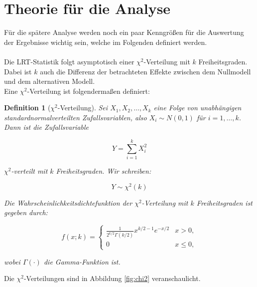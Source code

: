 \documentclass[%
thesis=student,%
coverpage=false,%
titlepage=false,%
headmarks=true, %
german,%
font=libertine, %
math=newpxtx, %
BCOR=5mm,%
coverBCOR=11mm%
]{tumbook}
\theoremstyle{break}
\newtheorem{definition}{Definition}[section]
\begin{document}
\section{Theorie für die Analyse}
Für die spätere Analyse werden noch ein paar Kenngrößen für die Auswertung der Ergebnisse wichtig sein, welche im Folgenden definiert werden.\\
\\
Die LRT-Statistik folgt asymptotisch einer $\chi^2$-Verteilung mit $k$ Freiheitsgraden. Dabei ist $k$ auch die Differenz der betrachteten Effekte zwischen dem Nullmodell und dem alternativen Modell. \\
Eine $\chi^2$-Verteilung ist folgendermaßen definiert:
\begin{definition}[$\chi^2$-Verteilung]
	Sei \( X_1, X_2, \ldots, X_k \) eine Folge von unabhängigen standardnormalverteilten Zufallsvariablen, also \( X_i \sim N(0, 1) \) für \( i = 1, \ldots, k \). Dann ist die Zufallsvariable 
	
	\[
	Y = \sum_{i=1}^{k} X_i^2
	\]
	
	$\chi^2$-verteilt mit \( k \) Freiheitsgraden. Wir schreiben:
	
	\[
	Y \sim \chi^2(k)
	\]
	
	Die Wahrscheinlichkeitsdichtefunktion der $\chi^2$-Verteilung mit \( k \) Freiheitsgraden ist gegeben durch:
	
	\[
	f(x; k) = \begin{cases} 
		\frac{1}{2^{k/2} \Gamma(k/2)} x^{k/2 - 1} e^{-x/2} & x > 0, \\
		0 & x \le 0,
	\end{cases}
	\]
	
	wobei \( \Gamma(\cdot) \) die Gamma-Funktion ist.
\end{definition} \noindent
Die $\chi^2$-Verteilungen sind in Abbildung \ref{fig:chi2} veranschaulicht.\\
\end{document}
